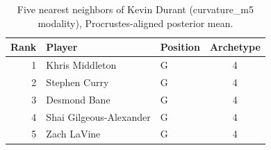 \begin{table}[htbp]
  \centering\small
  \begin{tabular}{rllc}
    \toprule
    Rank & Player & Position & Archetype \\
    \midrule
    1 & Khris Middleton & G & 4 \\
    2 & Stephen Curry & G & 4 \\
    3 & Desmond Bane & G & 4 \\
    4 & Shai Gilgeous-Alexander & G & 4 \\
    5 & Zach LaVine & G & 4 \\
    \bottomrule
  \end{tabular}
  \caption{Five nearest neighbors of Kevin Durant (curvature_m5 modality), Procrustes-aligned posterior mean.}
  \label{tab:Kevin_Durant_neighbors_curvature_m5}
\end{table}

